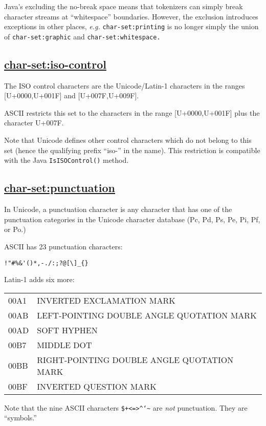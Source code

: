 Java's excluding the no-break space means that tokenizers can simply
break character streams at ``whitespace'' boundaries. However, the
exclusion introduces exceptions in other places, \emph{e.g.}
\texttt{char-set:printing} is no longer simply the union of
\texttt{char-set:graphic} and \texttt{char-set:whitespace.}

\subsection{\texorpdfstring{\href{}{char-set:iso-control}}{char-set:iso-control}}\label{char-setiso-control}

The ISO control characters are the Unicode/Latin-1 characters in the
ranges {[}U+0000,U+001F{]} and {[}U+007F,U+009F{]}.

ASCII restricts this set to the characters in the range
{[}U+0000,U+001F{]} plus the character U+007F.

Note that Unicode defines other control characters which do not belong
to this set (hence the qualifying prefix ``iso-'' in the name). This
restriction is compatible with the Java \texttt{IsISOControl()} method.

\subsection{\texorpdfstring{\href{}{char-set:punctuation}}{char-set:punctuation}}\label{char-setpunctuation}

In Unicode, a punctuation character is any character that has one of the
punctuation categories in the Unicode character database (Pc, Pd, Ps,
Pe, Pi, Pf, or Po.)

ASCII has 23 punctuation characters:

\begin{verbatim}
!"#%&'()*,-./:;?@[\]_{}
\end{verbatim}

Latin-1 adds six more:

\begin{longtable}[]{@{}ll@{}}
\toprule
00A1 & INVERTED EXCLAMATION MARK\tabularnewline
00AB & LEFT-POINTING DOUBLE ANGLE QUOTATION MARK\tabularnewline
00AD & SOFT HYPHEN\tabularnewline
00B7 & MIDDLE DOT\tabularnewline
00BB & RIGHT-POINTING DOUBLE ANGLE QUOTATION MARK\tabularnewline
00BF & INVERTED QUESTION MARK\tabularnewline
\bottomrule
\end{longtable}

Note that the nine ASCII characters
\texttt{\$+\textless{}=\textgreater{}\^{}`\textbar{}\textasciitilde{}}
are \emph{not} punctuation. They are ``symbols.''

